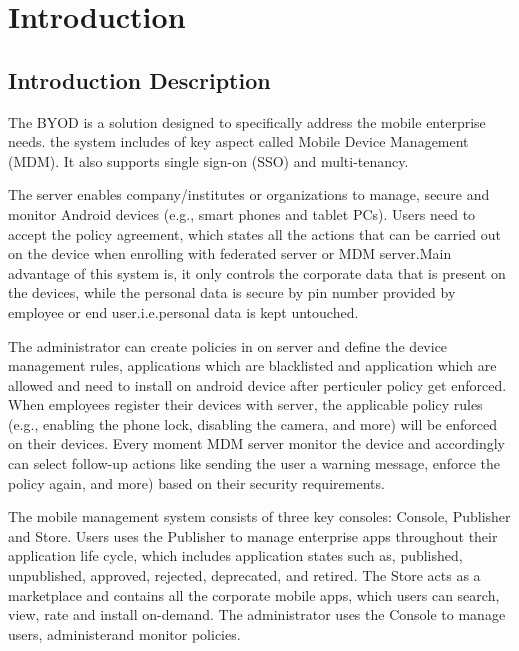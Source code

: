 \graphicspath{ {images/} }
\chapter{Introduction}
\thispagestyle{empty}
\section{Introduction Description}
\par \hspace{5mm} The BYOD is a solution designed to specifically address the mobile enterprise needs. the system includes of key aspect called Mobile Device Management (MDM). It also supports single sign-on (SSO) and multi-tenancy. 

\par The server enables company/institutes or organizations to manage, secure and monitor Android devices (e.g., smart phones and tablet PCs). Users need to accept the policy agreement, which states all the actions that can be carried out on the device when enrolling with federated server or MDM server.Main advantage of this system is, it only controls the corporate data that is present on the devices, while the personal data is secure by pin number provided by employee or end user.i.e.personal data is kept untouched.

\par The administrator can create policies in on server and define the device management rules, applications which are blacklisted and application which are allowed and need to install on android device after perticuler policy get enforced. When employees register their devices with server, the applicable policy rules (e.g., enabling the phone lock, disabling the camera, and more) will be enforced on their devices. Every moment MDM server monitor the device and accordingly can select follow-up actions like sending the user a warning message, enforce the policy again, and more) based on their security requirements.  

\par The mobile management system consists of three key consoles: Console, Publisher and Store. Users uses the Publisher to manage enterprise apps throughout their application life cycle, which includes application states such as, published, unpublished, approved, rejected, deprecated, and retired. The Store acts as a marketplace and contains all the corporate mobile apps, which users can search, view, rate and install on-demand. The administrator uses the Console to manage users, administerand monitor policies.


